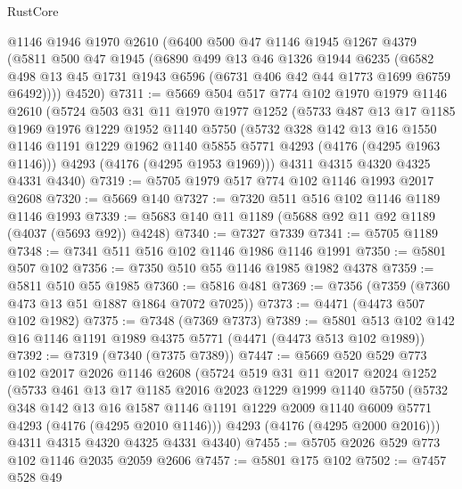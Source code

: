 \begin{lexlean}{RustCore}
\begin{coremodule}
    @1146
    @1946
    @1970
    @2610
    (@6400
      @500
      @47
      @1146
      @1945
      @1267
      @4379
      (@5811
        @500
        @47
        @1945
        (@6890
          @499
          @13
          @46
          @1326
          @1944
          @6235
          (@6582 @498 @13 @45 @1731 @1943 @6596 (@6731 @406 @42 @44 @1773 @1699 @6759 @6492))))
      @4520)
@7311 := @5669
    @504
    @517
    @774
    @102
    @1970
    @1979
    @1146
    @2610
    (@5724
      @503
      @31
      @11
      @1970
      @1977
      @1252
      (@5733
        @487
        @13
        @17
        @1185
        @1969
        @1976
        @1229
        @1952
        @1140
        @5750
        (@5732
          @328
          @142
          @13
          @16
          @1550
          @1146
          @1191
          @1229
          @1962
          @1140
          @5855
          @5771
          @4293
          (@4176 (@4295 @1963 @1146)))
        @4293
        (@4176 (@4295 @1953 @1969)))
      @4311
      @4315
      @4320
      @4325
      @4331
      @4340)
@7319 := @5705 @1979 @517 @774 @102 @1146 @1993 @2017 @2608
@7320 := @5669 @140
@7327 := @7320 @511 @516 @102 @1146 @1189 @1146 @1993
@7339 := @5683 @140 @11 @1189 (@5688 @92 @11 @92 @1189 (@4037 (@5693 @92)) @4248)
@7340 := @7327 @7339
@7341 := @5705 @1189
@7348 := @7341 @511 @516 @102 @1146 @1986 @1146 @1991
@7350 := @5801 @507 @102
@7356 := @7350 @510 @55 @1146 @1985 @1982 @4378
@7359 := @5811 @510 @55 @1985
@7360 := @5816 @481
@7369 := @7356 (@7359 (@7360 @473 @13 @51 @1887 @1864 @7072 @7025))
@7373 := @4471 (@4473 @507 @102 @1982)
@7375 := @7348 (@7369 @7373)
@7389 := @5801 @513 @102 @142 @16 @1146 @1191 @1989 @4375 @5771 (@4471 (@4473 @513 @102 @1989))
@7392 := @7319 (@7340 (@7375 @7389))
@7447 := @5669
    @520
    @529
    @773
    @102
    @2017
    @2026
    @1146
    @2608
    (@5724
      @519
      @31
      @11
      @2017
      @2024
      @1252
      (@5733
        @461
        @13
        @17
        @1185
        @2016
        @2023
        @1229
        @1999
        @1140
        @5750
        (@5732
          @348
          @142
          @13
          @16
          @1587
          @1146
          @1191
          @1229
          @2009
          @1140
          @6009
          @5771
          @4293
          (@4176 (@4295 @2010 @1146)))
        @4293
        (@4176 (@4295 @2000 @2016)))
      @4311
      @4315
      @4320
      @4325
      @4331
      @4340)
@7455 := @5705 @2026 @529 @773 @102 @1146 @2035 @2059 @2606
@7457 := @5801 @175 @102
@7502 := @7457
    @528
    @49

\end{coremodule}
\end{lexlean}
